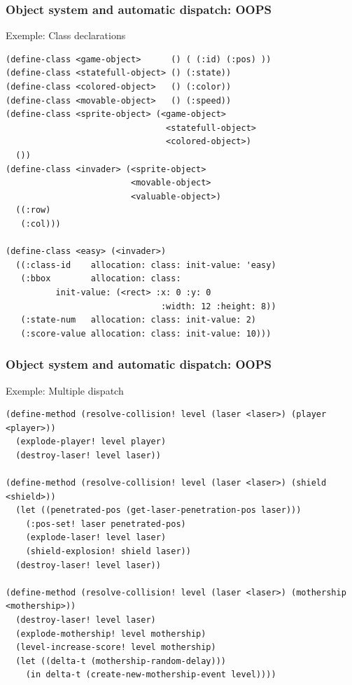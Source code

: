 \documentclass{beamer}
\newcommand{\<}[1]{\`#1}
\begin{document}
\begin{frame}[fragile]
  \frametitle{Object system and automatic dispatch: OOPS}

  \begin{block}{Exemple: Class declarations}
    \begin{lstlisting}[basicstyle=\tiny]
(define-class <game-object>      () ( (:id) (:pos) ))
(define-class <statefull-object> () (:state))
(define-class <colored-object>   () (:color))
(define-class <movable-object>   () (:speed))
(define-class <sprite-object> (<game-object>
                                <statefull-object>
                                <colored-object>)
  ())
(define-class <invader> (<sprite-object>
                         <movable-object>
                         <valuable-object>)
  ((:row)
   (:col)))

(define-class <easy> (<invader>)
  ((:class-id    allocation: class: init-value: 'easy)
   (:bbox        allocation: class: 
          init-value: (<rect> :x: 0 :y: 0
                               :width: 12 :height: 8))
   (:state-num   allocation: class: init-value: 2)
   (:score-value allocation: class: init-value: 10)))
    \end{lstlisting}
  \end{block}

\end{frame}


\begin{frame}[fragile]
  \frametitle{Object system and automatic dispatch: OOPS}

  \begin{block}{Exemple: Multiple dispatch}
    \begin{lstlisting}[basicstyle=\scriptsize]
(define-method (resolve-collision! level (laser <laser>) (player <player>))
  (explode-player! level player)
  (destroy-laser! level laser))

(define-method (resolve-collision! level (laser <laser>) (shield <shield>))
  (let ((penetrated-pos (get-laser-penetration-pos laser)))
    (:pos-set! laser penetrated-pos)
    (explode-laser! level laser)
    (shield-explosion! shield laser))
  (destroy-laser! level laser))

(define-method (resolve-collision! level (laser <laser>) (mothership <mothership>))
  (destroy-laser! level laser)
  (explode-mothership! level mothership)
  (level-increase-score! level mothership)
  (let ((delta-t (mothership-random-delay)))
    (in delta-t (create-new-mothership-event level))))
    \end{lstlisting}
  \end{block}
\end{frame}
\end{document}
